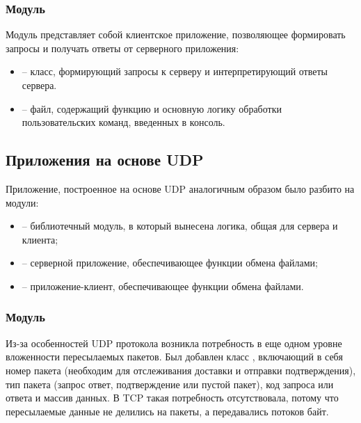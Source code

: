 \subsubsection{Модуль }

Модуль  представляет собой клиентское приложение, позволяющее формировать запросы и получать ответы от серверного приложения:
\begin{itemize}
	\item {} -- класс, формирующий запросы к серверу и интерпретирующий ответы сервера.
	\item {} -- файл, содержащий функцию  и основную логику обработки пользовательских команд, введенных в консоль.
\end{itemize}

\subsection{Приложения на основе UDP}

Приложение, построенное на основе UDP  аналогичным образом было разбито на модули:
\begin{itemize}
	\item {} -- библиотечный модуль, в который вынесена логика, общая для сервера и клиента;
	\item {} -- серверной приложение, обеспечивающее функции обмена файлами;
	\item {} -- приложение-клиент, обеспечивающее функции обмена файлами.
\end{itemize}

\subsubsection{Модуль }

Из-за особенностей UDP протокола возникла потребность в еще одном уровне вложенности пересылаемых пакетов. Был добавлен класс , включающий в себя номер пакета (необходим для отслеживания доставки и отправки подтверждения), тип пакета (запрос ответ, подтверждение или пустой пакет), код запроса или ответа и массив данных. В TCP такая потребность отсутствовала, потому что пересылаемые данные не делились на пакеты, а передавались потоков байт.


